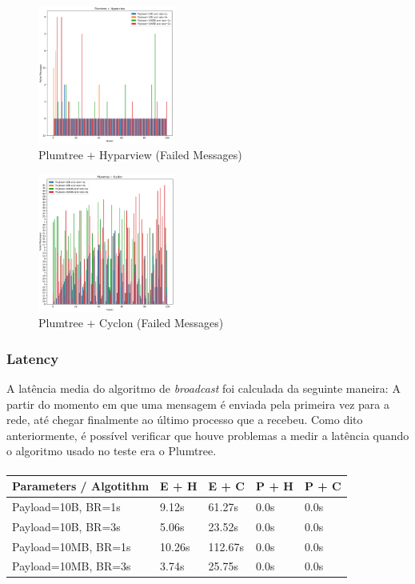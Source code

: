 \begin{figure}
  \includegraphics[width=0.4\textwidth]{images/Plumtree + HyparviewFailedMessages.png}
  \caption{Plumtree + Hyparview (Failed Messages)}
\end{figure}

\begin{figure}
  \includegraphics[width=0.4\textwidth]{images/Plumtree + CyclonFailedMessages.png}
  \caption{Plumtree + Cyclon (Failed Messages)}
\end{figure}


\subsubsection{Latency} 
A latência media do algoritmo de \textit{broadcast} foi calculada da seguinte maneira: A partir do momento em que uma mensagem é enviada pela primeira vez para a rede, até chegar finalmente ao último processo que a recebeu. 
Como dito anteriormente, é possível verificar que houve problemas a medir a latência quando o algoritmo usado no teste era o Plumtree.

\paragraph{}

\begin{tabular}{ |p{3cm}||p{0.68cm}|p{0.69 cm}|p{0.67cm}|p{0.67cm}|}
\hline
 Parameters / Algotithm &E + H&E + C&P + H &P + C\\
\hline
\hline
Payload=10B, BR=1s & 9.12s & 61.27s & 0.0s & 0.0s\\
\hline
Payload=10B, BR=3s & 5.06s & 23.52s & 0.0s & 0.0s\\
\hline
Payload=10MB, BR=1s & 10.26s& 112.67s & 0.0s & 0.0s\\
\hline
Payload=10MB, BR=3s& 3.74s & 25.75s & 0.0s& 0.0s\\
\hline
\end{tabular}

